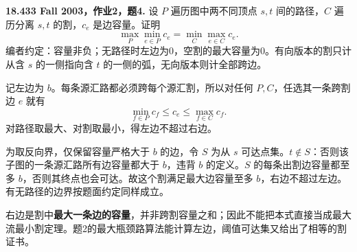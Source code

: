 \begin{exercise}\label{mit:18433-a2-q4}
\textbf{18.433 Fall 2003，作业2，题4.}
设 $P$ 遍历图中两不同顶点 $s,t$ 间的路径，$C$ 遍历分离 $s,t$ 的割，$c_e$ 是边容量。证明
\[
 \max_P\min_{e\in P}c_e=\min_C\max_{e\in C}c_e.
\]
编者约定：容量非负；无路径时左边为0，空割的最大容量为0。有向版本的割只计从含 $s$ 的一侧指向含 $t$ 的一侧的弧，无向版本则计全部跨边。
\end{exercise}
\begin{solution}
记左边为 $b$。每条源汇路都必须跨每个源汇割，所以对任何 $P,C$，任选其一条跨割边 $e$ 就有
\[
 \min_{f\in P}c_f\le c_e\le\max_{f\in C}c_f.
\]
对路径取最大、对割取最小，得左边不超过右边。

为取反向界，仅保留容量严格大于 $b$ 的边，令 $S$ 为从 $s$ 可达点集。$t\notin S$：否则该子图的一条源汇路所有边容量都大于 $b$，违背 $b$ 的定义。$S$ 的每条出割边容量都至多 $b$，否则其终点也会可达。故这个割满足最大边容量至多 $b$，右边不超过左边。有无路径的边界按题面约定同样成立。

右边是割中\textbf{最大一条边的容量}，并非跨割容量之和；因此不能把本式直接当成最大流最小割定理。题2的最大瓶颈路算法能计算左边，阈值可达集又给出了相等的割证书。
\end{solution}

